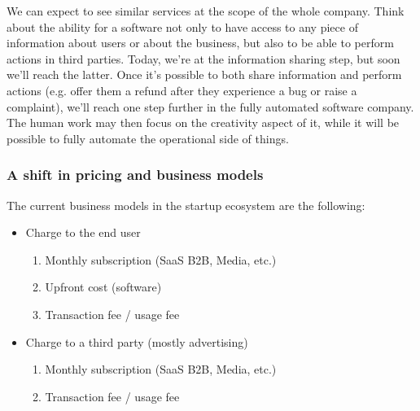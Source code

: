 \documentclass[12pt]{article}
\begin{document}
\smallskip

We can expect to see similar services at the scope of the whole company. Think
about the ability for a software not only to have access to any piece of
information about users or about the business, but also to be able to perform
actions in third parties. Today, we're at the information sharing step, but soon
we'll reach the latter. Once it's possible to both share information and perform
actions (e.g. offer them a refund after they experience a bug or raise a
complaint), we'll reach one step further in the fully automated software
company. The human work may then focus on the creativity aspect of it, while it
will be possible to fully automate the operational side of things.

\subsubsection{A shift in pricing and business models}
The current business models in the startup ecosystem are the following:
\begin{itemize}
  \item Charge to the end user
  \begin{enumerate}
    \item Monthly subscription (SaaS B2B, Media, etc.)
    \item Upfront cost (software)
    \item Transaction fee / usage fee
  \end{enumerate}
  \item Charge to a third party (mostly advertising)
  \begin{enumerate}
    \item Monthly subscription (SaaS B2B, Media, etc.)
    \item Transaction fee / usage fee
  \end{enumerate}
\end{itemize}
\end{document}
